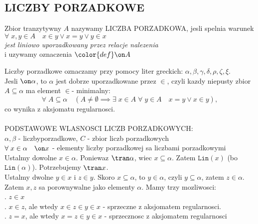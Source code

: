 \documentclass{article}
\begin{document}
\subsection*{LICZBY PORZADKOWE}
    \begin{center}\large
        Zbior tranzytywny $A$ nazywamy {\color{def} LICZBA PORZADKOWA}, jesli spelnia warunek\smallskip\\
        $\forall\;x,y\in A\quad x\in y\lor x=y\lor y\in x$\medskip\\
        \emph{\normalsize\color{emp}jest liniowo uporzadkowany przez relacje nalezenia}\medskip\\
        i uzywamy oznaczenia $\color{def}\on A$
    \end{center}\bigskip
    Liczby porzadkowe oznaczamy przy pomocy liter greckich: $\alpha, \beta, \gamma, \delta, \rho, \zeta, \xi$.\bigskip\\
    {\large Jesli {\color{acc}$\on\alpha$, to $\alpha$ jest dobrze uporzadkowane przez $\in$}, czyli kazdy niepusty zbior $A\subseteq \alpha$ ma element $\in$- minimalny:}\smallskip
    $$\forall\;A\subseteq\alpha\quad(A\neq\emptyset\implies\exists\;x\in A\;\forall\;y\in A\quad x=y\lor x\in y),$$
    co wynika z aksjomatu regularnosci.\bigskip\\\bigskip\\
    {\large \color{def}PODSTAWOWE WLASNOSCI LICZB PORZADKOWYCH:}\medskip\\
    $\alpha,\beta$ - liczbyporzadkowe, $C$ - zbior liczb porzadkowych\medskip\\
     $\forall\;x\in\alpha\quad\on x$ - {\color{acc}elementy liczby porzadkowej sa liczbami porzadkowymi}\medskip\\
    Ustalmy dowolne $x\in\alpha$. Poniewaz $\tran \alpha$, wiec $x\subseteq \alpha$. Zatem $\texttt{Lin}(x)$ (bo $\texttt{Lin}(\alpha)$). Potrzebujemy $\tran x$.\smallskip\\
    Ustalmy dwolne $y\in x$ i $z\in y$. Skoro $x\subseteq\alpha$, to $y\in\alpha$, czyli $y\subseteq \alpha$, zatem $z\in \alpha$.\smallskip\\
    Zatem $x, z$ sa porownywalne jako elementy $\alpha$. Mamy trzy mozliwosci:\smallskip\\
    \indent {}. $z\in x$\smallskip\\
    \indent {}. $x\in z$, ale wtedy $x\in z\in y\in x$ - sprzeczne z aksjomatem regularnosci.\smallskip\\
    \indent {}. $z=x$, ale wtedy $x=z\in y\in x$ - sprzecznosc z aksjomatem regularnosci\kondow
\end{document}
